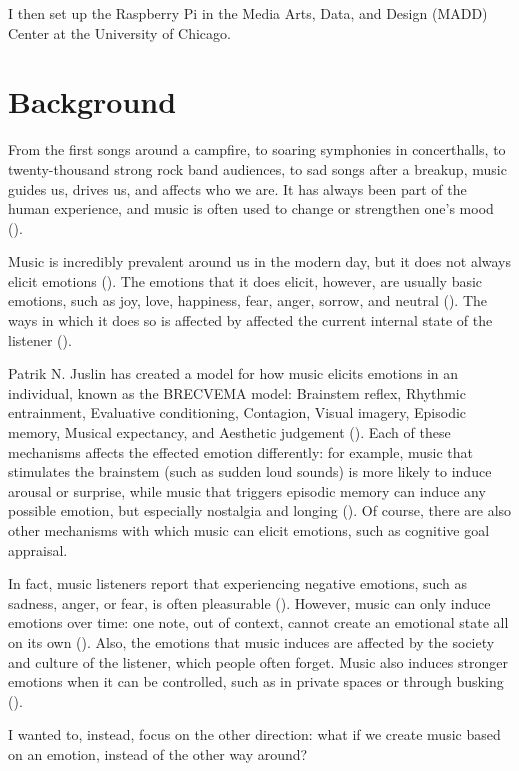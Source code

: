 \documentclass{article}
\renewcommand{\_}[1]{\underline{ #1 }}
\theoremstyle{definition}
\begin{document}
I then set up the Raspberry Pi in the Media Arts, Data, and Design (MADD) Center at the University of Chicago. 


\section{Background}

From the first songs around a campfire, to soaring symphonies in concerthalls, to twenty-thousand strong rock band audiences, to sad songs after a breakup, music guides us, drives us, and affects who we are. It has always been part of the human experience, and music is often used to change or strengthen one's mood (\cite{huron2011}).

Music is incredibly prevalent around us in the modern day, but it does not always elicit emotions (\cite{16juslin2019}). The emotions that it does elicit, however, are usually basic emotions, such as joy, love, happiness, fear, anger, sorrow, and neutral (\cite{sundberg1983}). The ways in which it does so is affected by affected the current internal state of the listener (\cite{harrer1977}). 

Patrik N. Juslin has created a model for how music elicits emotions in an individual, known as the BRECVEMA model: Brainstem reflex, Rhythmic entrainment, Evaluative conditioning, Contagion, Visual imagery, Episodic memory, Musical expectancy, and Aesthetic judgement (\cite{17juslin2019}). Each of these mechanisms affects the effected emotion differently: for example, music that stimulates the brainstem (such as sudden loud sounds) is more likely to induce arousal or surprise, while music that triggers episodic memory can induce any possible emotion, but especially nostalgia and longing (\cite{25juslin2019}). Of course, there are also other mechanisms with which music can elicit emotions, such as cognitive goal appraisal. 

In fact, music listeners report that experiencing negative emotions, such as sadness, anger, or fear, is often pleasurable (\cite{32juslin2019}). However, music can only induce emotions over time: one note, out of context, cannot create an emotional state all on its own (\cite{schubert2001}). Also, the emotions that music induces are affected by the society and culture of the listener, which people often forget. Music also induces stronger emotions when it can be controlled, such as in private spaces or through busking (\cite{oneill2001}). 

I wanted to, instead, focus on the other direction: what if we create music based on an emotion, instead of the other way around?
\end{document}
